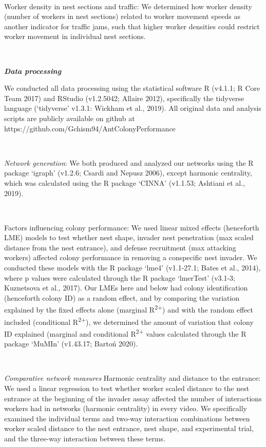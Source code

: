 \documentclass[3p]{elsarticle} %
\begin{document}
~

Worker density in nest sections and traffic: We determined how worker
density (number of workers in nest sections) related to worker movement
speeds as another indicator for traffic jams, such that higher worker
densities could restrict worker movement in individual nest sections.

~

\textbf{\emph{Data processing}}

We conducted all data processing using the statistical software R
(v4.1.1; R Core Team 2017) and RStudio (v1.2.5042; Allaire 2012),
specifically the tidyverse language (`tidyverse' v1.3.1: Wickham et al.,
2019). All original data and analysis scripts are publicly available on
github at https://github.com/Gchism94/AntColonyPerformance

~

\emph{Network generation}: We both produced and analyzed our networks
using the R package `igraph' (v1.2.6; Csardi and Nepusz 2006), except
harmonic centrality, which was calculated using the R package `CINNA'
(v1.1.53; Ashtiani et al., 2019).

~

Factors influencing colony performance: We used linear mixed effects
(henceforth LME) models to test whether nest shape, invader nest
penetration (max scaled distance from the nest entrance), and defense
recruitment (max attacking workers) affected colony performance in
removing a conspecific nest invader. We conducted these models with the
R package `lme4' (v1.1-27.1; Bates et al., 2014), where p values were
calculated through the R package `lmerTest' (v3.1-3; Kuznetsova et al.,
2017). Our LMEs here and below had colony identification (henceforth
colony ID) as a random effect, and by comparing the variation explained
by the fixed effects alone (marginal R\textsuperscript{2+}) and with the
random effect included (conditional R\textsuperscript{2+}), we
determined the amount of variation that colony ID explained (marginal
and conditional R\textsuperscript{2+} values calculated through the R
package `MuMIn' (v1.43.17; Bartoń 2020).

~

\emph{Comparative network measures} Harmonic centrality and distance to
the entrance: We used a linear regression to test whether worker scaled
distance to the nest entrance at the beginning of the invader assay
affected the number of interactions workers had in networks (harmonic
centrality) in every video. We specifically examined the individual
terms and two-way interaction combinations between worker scaled
distance to the nest entrance, nest shape, and experimental trial, and
the three-way interaction between these terms.
\end{document}
